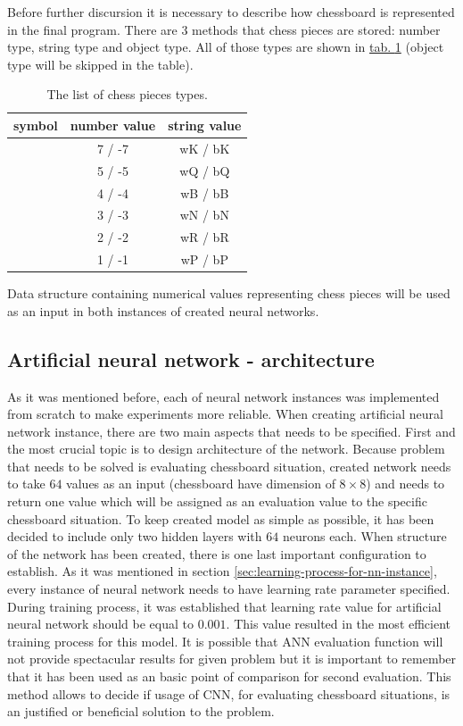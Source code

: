Before further discursion it is necessary to describe how chessboard is represented in the final program. There are $3$ methods that chess pieces are stored: number type, string type and object type. All of those types are shown in \hyperref[tab:chess-pieces-types]{tab. \ref*{tab:chess-pieces-types}} (object type will be skipped in the table).
\begin{table}
	\centering
	\caption{The list of chess pieces types.}
	\label{tab:chess-pieces-types}
	\begin{tabular}{ccc}
	\toprule
		\textbf{symbol} & \textbf{number value} & \textbf{string value}\\
		\hline
			\WhiteKingOnWhite \BlackKingOnWhite & 7 / -7 & wK / bK\\
		\hline
			\WhiteQueenOnWhite \BlackQueenOnWhite & 5 / -5 & wQ / bQ\\
		\hline
			\WhiteBishopOnWhite \BlackBishopOnWhite & 4 / -4 & wB / bB\\
		\hline
			\WhiteKnightOnWhite \BlackKnightOnWhite & 3 / -3 & wN / bN\\
		\hline
			\WhiteRookOnWhite \BlackRookOnWhite & 2 / -2 & wR / bR\\
		\hline
			\WhitePawnOnWhite \BlackPawnOnWhite & 1 / -1 & wP / bP\\
	\end{tabular}
\end{table}
Data structure containing numerical values representing chess pieces will be used as an input in both instances of created neural networks.

\subsection{Artificial neural network - architecture}
As it was mentioned before, each of neural network instances was implemented from scratch to make experiments more reliable. When creating artificial neural network instance, there are two main aspects that needs to be specified. First and the most crucial topic is to design architecture of the network. Because problem that needs to be solved is evaluating chessboard situation, created network needs to take $64$ values as an input (chessboard have dimension of $8 \times 8$) and needs to return one value which will be assigned as an evaluation value to the specific chessboard situation. To keep created model as simple as possible, it has been decided to include only two hidden layers with $64$ neurons each. When structure of the network has been created, there is one last important configuration to establish. As it was mentioned in section \ref{sec:learning-process-for-nn-instance}, every instance of neural network needs to have learning rate parameter specified. During training process, it was established that learning rate value for artificial neural network should be equal to $0.001$. This value resulted in the most efficient training process for this model. It is possible that ANN evaluation function will not provide spectacular results for given problem but it is important to remember that it has been used as an basic point of comparison for second evaluation. This method allows to decide if usage of CNN, for evaluating chessboard situations, is an justified or beneficial solution to the problem.

